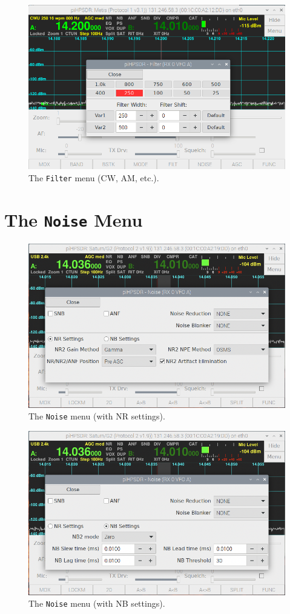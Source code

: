 \documentclass[12pt]{book}
\def\bltt#1{\texttt{\color{blue}#1}}
\begin{document}
\begin{figure}[h]
\center
\includegraphics[width=12cm]{FilterMenuCW.png}
\caption{The \bltt{Filter} menu (CW, AM, etc.).}
\label{fig:FilterMenuCW}
\end{figure}


\section{The \texttt{Noise} Menu}
\begin{figure}[h]
\center
\includegraphics[width=12cm]{NoiseMenu1.png}
\caption{The \bltt{Noise} menu (with NR settings).}
\label{fig:NoiseMenu1}
\end{figure}

\begin{figure}[h]
\center
\includegraphics[width=12cm]{NoiseMenu2.png}
\caption{The \bltt{Noise} menu (with NB settings).}
\label{fig:NoiseMenu2}
\end{figure}
\end{document}
